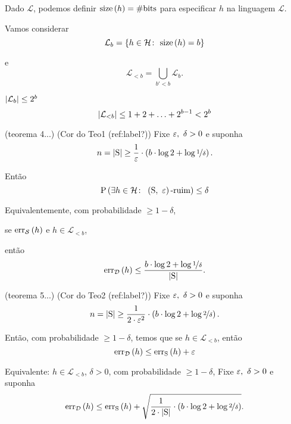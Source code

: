 Dado $\mathcal{L}$, podemos definir $\mathrm{size}\left(h\vphantom{1j}\right)=\#\mathrm{bits}$ para especificar $h$ na linguagem $\mathcal{L}$.

Vamos considerar
\[
  \mathcal{L}_b = \left\{h\in\mathcal{H}\colon\ \mathrm{size}\left(h\vphantom{1j}\right)=b\vphantom{1j}\right\}
\]

e
\[
  \mathcal{L}_{<b} = \bigcup_{b'<b} \mathcal{L}_b.
\]

\begin{observacao}
  $\left|\mathcal{L}_b\vphantom{1j}\right| \leq 2^b$
  \[
    \left|\mathcal{L}_{<b}\vphantom{1j}\right| \leq 1 + 2 + \ldots + 2^{b-1} < 2^b
  \]
\end{observacao}

\begin{teorema}
  \label{teo:teo4}
  \normalfont
  (teorema 4...)
  (Cor do Teo1 (ref:label?))
  Fixe $\eps,\ \delta>0$ e suponha
  \[
    n = \left|\mathrm{S}\vphantom{1j}\right| \geq \frac{1}{\varepsilon}\cdot\left(b\cdot\log2 + \log\nicefrac{1}{\delta}\vphantom{1j}\right).
  \]

  Então
  \[
    \mathrm{P}\left(\exists h\in\mathcal{H}\colon\ \left(\mathrm{S},\ \eps\vphantom{1j}\right)\text{-ruim}\vphantom{1j}\right) \leq \delta
  \]
\end{teorema}

Equivalentemente, com probabilidade $\geq 1-\delta$,

se $\mathrm{err}_\mathcal{S}\left(h\vphantom{1j}\right)$ e $h\in\mathcal{L}_{<b}$,

então
\[
  \mathrm{err}_\mathcal{D}\left(h\vphantom{1j}\right) \leq \frac{b\cdot\log2 + \log\nicefrac{1}{\delta}}{\left|\mathrm{S}\vphantom{1j}\right|}.
\]

\begin{teorema}
  \label{teo:teo5}
  \normalfont
  (teorema 5...)
  (Cor do Teo2 (ref:label?))
  Fixe $\eps,\ \delta>0$ e suponha
  \[
    n = \left|\mathrm{S}\vphantom{1j}\right| \geq \frac{1}{2\cdot\varepsilon^2}\cdot\left(b\cdot\log2 + \log\nicefrac{2}{\delta}\vphantom{1j}\right).
  \]

  Então, com probabilidade $\geq 1-\delta$, temos que se $h\in\mathcal{L}_{<b}$, então
  \[
    \mathrm{err}_\mathcal{D}\left(h\vphantom{1j}\right) \leq \mathrm{err}_\mathrm{S}\left(h\vphantom{1j}\right) + \varepsilon
  \]
\end{teorema}

\begin{corolario}
  \normalfont
  Equivalente: $h\in\mathcal{L}_{<b}$, $\delta>0$, com probabilidade $\geq 1-\delta$,
  Fixe $\eps,\ \delta>0$ e suponha
  \[
    \mathrm{err}_\mathcal{D}\left(h\vphantom{1j}\right) \leq \mathrm{err}_\mathrm{S}\left(h\vphantom{1j}\right) + \sqrt{\frac{1}{2\cdot\left|\mathrm{S}\vphantom{1j}\right|}\cdot\left(b\cdot\log2 + \log\nicefrac{2}{\delta}\vphantom{1j}\right)}.
  \]
\end{corolario}

